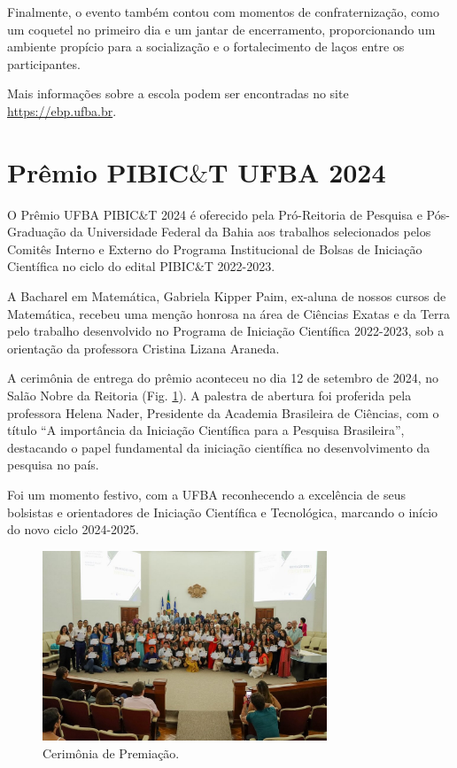 \documentclass{hipatia}
\begin{document}
Finalmente, o evento também contou com momentos de confraternização, como um coquetel no primeiro dia e um jantar de encerramento, proporcionando um ambiente propício para a socialização e o fortalecimento de laços entre os participantes.

Mais informações sobre a escola podem ser encontradas no site \href{https://ebp.ufba.br/}{https://ebp.ufba.br}.



\section{Prêmio PIBIC$\&$T UFBA 2024} %



O Prêmio UFBA PIBIC$\&$T 2024 é oferecido pela Pró-Reitoria de Pesquisa e Pós-Graduação da  Universidade Federal da Bahia aos trabalhos selecionados pelos Comitês Interno e Externo do Programa Institucional de Bolsas de Iniciação Científica no ciclo do edital PIBIC$\&$T 2022-2023.

A Bacharel em Matemática,  Gabriela Kipper Paim, ex-aluna de nossos cursos de Matemática, recebeu uma  menção honrosa na área de Ciências Exatas e da Terra pelo trabalho desenvolvido no Programa de Iniciação Científica 2022-2023, sob a orientação da professora Cristina Lizana Araneda.

A cerimônia de entrega do prêmio aconteceu no dia 12 de setembro de 2024, no Salão Nobre da Reitoria (Fig. \ref{premio}).  A palestra de abertura foi proferida pela professora Helena Nader, Presidente da Academia Brasileira de Ciências, com o título “A importância da Iniciação Científica para a Pesquisa Brasileira”, destacando o papel fundamental da iniciação científica no desenvolvimento da pesquisa no país.

 Foi um momento festivo, com a UFBA reconhecendo a excelência de seus bolsistas e orientadores de Iniciação Científica e Tecnológica, marcando o início do novo ciclo 2024-2025.


\begin{figure}[htb]
    \centering
    \includegraphics[width=8.5cm]{PIBIC3.jpg}
    \caption{Cerimônia de Premiação.}
 \label{premio}
\end{figure}
\end{document}
